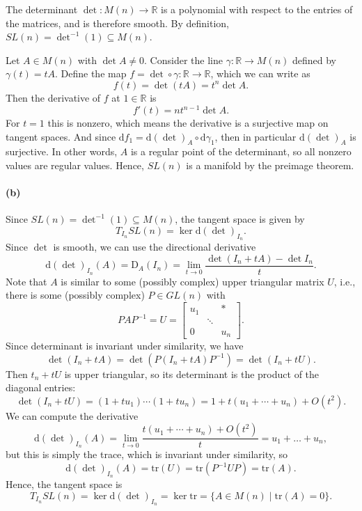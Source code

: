 \documentclass[12pt]{article}
\theoremstyle{definition}
\newcommand{\R}{\mathbb{R}}
\newcommand{\<}{\langle}
\renewcommand{\>}{\rangle}
\newcommand{\seq}{\subseteq}
\newcommand{\dd}{\mathrm{d}}
\begin{document}
The determinant $\det : M(n) \to \R$ is a polynomial with respect to the entries of the matrices, and is therefore smooth.
By definition, $SL(n) = \det^{-1}(1) \seq M(n)$.

Let $A \in M(n)$ with $\det A \ne 0$.
Consider the line $\gamma : \R \to M(n)$ defined by $\gamma(t) = tA$.
Define the map $f = \det \circ \gamma : \R \to \R$, which we can write as
\[
    f(t) = \det(tA) = t^n\det A.
\]
Then the derivative of $f$ at $1 \in \R$ is
\[
    f'(t) = nt^{n-1}\det A.
\]
For $t = 1$ this is nonzero, which means the derivative is a surjective map on tangent spaces.
And since $\dd{f}_1 = \dd(\det)_A \circ \dd{\gamma}_1$, then in particular $\dd(\det)_A$ is surjective.
In other words, $A$ is a regular point of the determinant, so all nonzero values are regular values.
Hence, $SL(n)$ is a manifold by the preimage theorem.

\paragraph{(b)}

Since $SL(n) = \det^{-1}(1) \seq M(n)$, the tangent space is given by
\[
    T_{I_n}SL(n) = \ker \dd(\det)_{I_n}.
\]
Since $\det$ is smooth, we can use the directional derivative
\[
    \dd(\det)_{I_n}(A)
        = \mathrm{D}_A(I_n)
        = \lim_{t \to 0} \frac{\det(I_n + tA) - \det I_n}{t}.
\]
Note that $A$ is similar to some (possibly complex) upper triangular matrix $U$, i.e., there is some (possibly complex) $P \in GL(n)$ with 
\[
    PAP^{-1} = U = \begin{bmatrix}
        u_1 & & * \\
        & \ddots \\
        0 & & u_n
    \end{bmatrix}.
\]
Since determinant is invariant under similarity, we have
\[
    \det(I_n + tA)
        = \det(P(I_n + tA)P^{-1})
        = \det(I_n + tU).
\]
Then $t_n + tU$ is upper triangular, so its determinant is the product of the diagonal entries:
\[
    \det(I_n + tU)
        = (1 + tu_1) \cdots (1 + tu_n)
        = 1 + t(u_1 + \cdots + u_n) + O(t^2).
\]
We can compute the derivative
\[
    \dd(\det)_{I_n}(A)
        = \lim_{t \to 0} \frac{t(u_1 + \cdots + u_n) + O(t^2)}{t}
        = u_1 + \dots + u_n,
\]
but this is simply the trace, which is invariant under similarity, so
\[
    \dd(\det)_{I_n}(A)
        = \mathrm{tr}(U)
        = \mathrm{tr}(P^{-1}UP)
        = \mathrm{tr}(A).
\]
Hence, the tangent space is
\[
    T_{I_n}SL(n)
        = \ker \dd(\det)_{I_n}
        = \ker \mathrm{tr}
        = \{A \in M(n) \mid \mathrm{tr}(A) = 0\}.
\]
\end{document}

